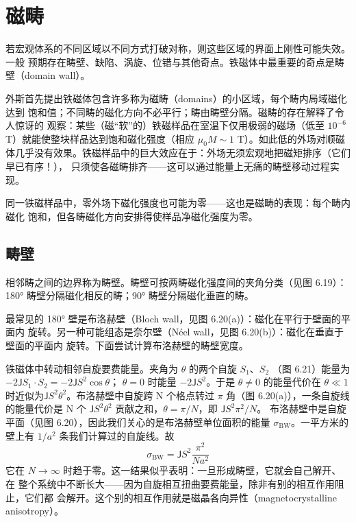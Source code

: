 \section{磁畴}

若宏观体系的不同区域以不同方式打破对称，则这些区域的界面上刚性可能失效。一般
预期存在畴壁、缺陷、涡旋、位错与其他奇点。铁磁体中最重要的奇点是畴壁（domain
wall）。

外斯首先提出铁磁体包含许多称为磁畴（domains）的小区域，每个畴内局域磁化达到
饱和值；不同畴的磁化方向不必平行；畴由畴壁分隔。磁畴的存在解释了令人惊讶的
观察：某些（磁“软”的）铁磁样品在室温下仅用极弱的磁场（低至 $10^{-6}$ T）就能使整块样品达到饱和磁化强度（相应
$\mu_0M\sim1$ T）。如此低的外场对顺磁体几乎没有效果。铁磁样品中的巨大效应在于：外场无须宏观地把磁矩排序（它们早已有序！），
只须使各磁畴排齐——这可以通过能量上无痛的畴壁移动过程实现。

同一铁磁样品中，零外场下磁化强度也可能为零——这也是磁畴的表现：每个畴内磁化
饱和，但各畴磁化方向安排得使样品净磁化强度为零。

\subsection{畴壁}

相邻畴之间的边界称为畴壁。畴壁可按两畴磁化强度间的夹角分类（见图 6.19）：180°
畴壁分隔磁化相反的畴；90° 畴壁分隔磁化垂直的畴。

最常见的 180° 壁是布洛赫壁（Bloch wall，见图 6.20(a)）：磁化在平行于壁面的平面内
旋转。另一种可能组态是奈尔壁（Néel wall，见图 6.20(b)）：磁化在垂直于壁面的平面内
旋转。下面尝试计算布洛赫壁的畴壁宽度。

铁磁体中转动相邻自旋要费能量。夹角为 $\theta$ 的两个自旋 $S_1$、$S_2$
（图 6.21）能量为 $-2\mathsf{J}S_1\cdot S_2=-2\mathsf{J}S^{2}\cos\theta$；
$\theta=0$ 时能量 $-2\mathsf{J}S^{2}$。于是 $\theta\neq0$ 的能量代价在 $\theta\ll1$
时近似为$\mathsf{J}S^{2}\theta^{2}$。布洛赫壁中自旋跨 N 个格点转过 $\pi$ 角（图 6.20(a)），一条自旋线的能量代价是 N 个
$\mathsf{J}S^{2}\theta^{2}$ 贡献之和，$\theta=\pi/N$，即 $\mathsf{J}S^{2}\pi^{2}/N$。
布洛赫壁中是自旋平面（见图 6.20），因此我们关心的是布洛赫壁单位面积的能量
$\sigma_{\mathrm{BW}}$。一平方米的壁上有 $1/a^{2}$ 条我们计算过的自旋线。故
\begin{equation*}
\sigma_{\mathrm{BW}} = \mathsf{J}S^{2}\frac{\pi^{2}}{Na^{2}}\tag{6.37}
\end{equation*}
它在 $N\to\infty$ 时趋于零。这一结果似乎表明：一旦形成畴壁，它就会自己解开、在
整个系统中不断长大——因为自旋相互扭曲要费能量，除非有别的相互作用阻止，它们都
会解开。这个别的相互作用就是磁晶各向异性（magnetocrystalline anisotropy）。

